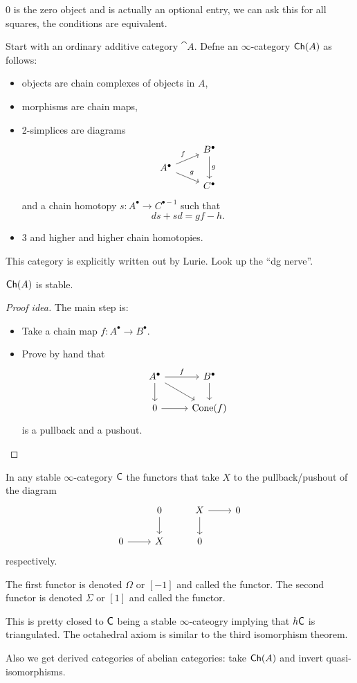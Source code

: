 \begin{remark}
	0 is the zero object and is actually an optional entry, we can ask this for all squares, the conditions are equivalent.
\end{remark}
\begin{example}
	Start with an ordinary additive category $\cat{A}$. Defne an $\infty$-category $\mathsf{Ch}(A)$ as follows:
	\begin{itemize}
		\item objects are chain complexes of objects in $A$,
		\item morphisms are chain maps,
		\item 2-simplices are diagrams
			\[
			\begin{tikzcd}[row sep=tiny]
			& B^{\bullet} \ar[dd,"g"] \\
			A^{\bullet} \ar[ur,"f"] \ar[dr,"g"] \\
			& C^{\bullet}
			\end{tikzcd}
			\] 
			and a chain homotopy $s:A^{\bullet}\to C^{\bullet-1}$ such that
			\[
			ds + sd = gf-h.
			\] 
		\item 3 and higher and higher chain homotopies.
	\end{itemize}
\end{example}
This category is explicitly written out by Lurie. Look up the ``dg nerve''.
\begin{lemma}
	$\mathsf{Ch}(A)$ is stable.
\end{lemma}
\begin{proof}[Proof idea]
	The main step is:
	\begin{itemize}
		\item Take a chain map $f:A^{\bullet}\to B^{\bullet}$.
		\item Prove by hand that
			\[
			\begin{tikzcd}
				A^{\bullet} \ar[r,"f"] \ar[d] \ar[dr] & B^{\bullet} \ar[d] \\
				0 \ar[r] & \Cone(f)
			\end{tikzcd}
			\] 
			is a pullback and a pushout.
	\end{itemize}	
\end{proof}
\begin{lemma}
	In any stable $\infty$-category $\mathsf{C}$ the functors that take $X$ to the pullback/pushout of the diagram
	\[
	\begin{tikzcd}
		& 0 \ar[d] & X \ar[r] \ar[d] & 0 \\
		0 \ar[r] & X & 0
	\end{tikzcd}
	\] 
	respectively.
\end{lemma}
The first functor is denoted $\Omega$ or $[-1]$ and called the  functor. The second functor is denoted $\Sigma$ or $[1]$ and called the  functor.
\begin{remark}
	This is pretty closed to $\mathsf{C}$ being a stable $\infty$-cateogry implying that $h\mathsf{C}$ is triangulated. The octahedral axiom is similar to the third isomorphism theorem.
\end{remark}
Also we get derived categories of abelian categories: take $\mathsf{Ch}(A)$ and invert quasi-isomorphisms.

